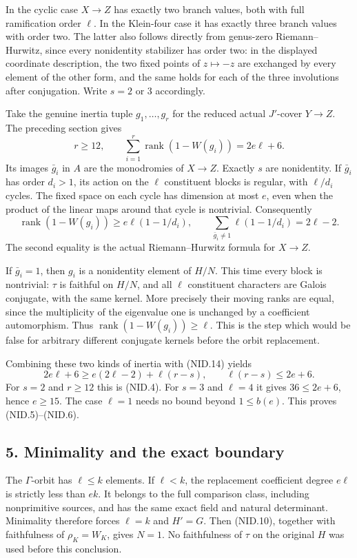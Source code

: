 In the cyclic case $X\to Z$ has exactly two branch values, both
with full ramification order $\ell$.  In the Klein-four case it
has exactly three branch values with order two.  The latter also
follows directly from genus-zero Riemann--Hurwitz, since every
nonidentity stabilizer has order two: in the displayed coordinate
description, the two fixed points of $z\mapsto-z$ are exchanged
by every element of the other form, and the same holds for each
of the three involutions after conjugation.  Write $s=2$ or $3$
accordingly.

Take the genuine inertia tuple $g_1,\ldots,g_r$ for the reduced
actual $J'$-cover $Y\to Z$.  The preceding section gives
\[
 r\ge12,
 \qquad \sum_{i=1}^r\operatorname{rank}(1-W(g_i))=2e\ell+6.
 \tag{NID.14}
\]
Its images $\bar g_i$ in $A$ are the monodromies of $X\to Z$.
Exactly $s$ are nonidentity.  If $\bar g_i$ has order $d_i>1$,
its action on the $\ell$ constituent blocks is regular, with
$\ell/d_i$ cycles.  The fixed space on each cycle has dimension
at most $e$, even when the product of the linear maps around that
cycle is nontrivial.  Consequently
\[
 \operatorname{rank}(1-W(g_i))\ge e\ell(1-1/d_i),
 \qquad
 \sum_{\bar g_i\ne1}\ell(1-1/d_i)=2\ell-2.
 \tag{NID.15}
\]
The second equality is the actual Riemann--Hurwitz formula for
$X\to Z$.

If $\bar g_i=1$, then $g_i$ is a nonidentity element of $H/N$.
This time every block is nontrivial: $\tau$ is faithful on
$H/N$, and all $\ell$ constituent characters are Galois
conjugate, with the same kernel.  More precisely their moving
ranks are equal, since the multiplicity of the eigenvalue one
is unchanged by a coefficient automorphism.  Thus
$\operatorname{rank}(1-W(g_i))\ge\ell$.
This is the step which would be false for arbitrary different
conjugate kernels before the orbit replacement.

Combining these two kinds of inertia with (NID.14) yields
\[
 2e\ell+6\ge e(2\ell-2)+\ell(r-s),
 \qquad \ell(r-s)\le2e+6.
 \tag{NID.16}
\]
For $s=2$ and $r\ge12$ this is (NID.4).  For $s=3$ and
$\ell=4$ it gives $36\le2e+6$, hence $e\ge15$.
The case $\ell=1$ needs no bound beyond $1\le b(e)$.
This proves (NID.5)--(NID.6).

\subsection*{5. Minimality and the exact boundary}

The $\Gamma$-orbit has $\ell\le k$ elements.  If $\ell<k$,
the replacement coefficient degree $e\ell$ is strictly less
than $ek$.  It belongs to the full comparison class, including
nonprimitive sources, and has the same exact field and natural
determinant.  Minimality therefore forces $\ell=k$ and $H'=G$.
Then (NID.10), together with faithfulness of $\rho_K=W_K$,
gives $N=1$.  No faithfulness of $\tau$ on the original $H$
was used before this conclusion.

